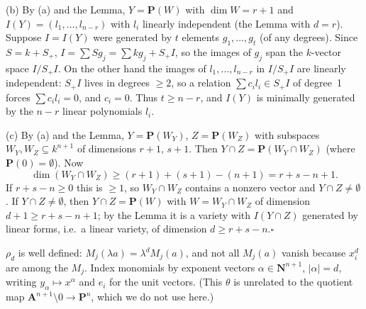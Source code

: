 \documentclass[11pt]{article}
\begin{document}
(b) By (a) and the Lemma, $Y=\mathbf P(W)$ with $\dim W=r+1$ and $I(Y)=(l_1,\dots,l_{n-r})$ with $l_i$ linearly independent (the Lemma with $d=r$). Suppose $I=I(Y)$ were generated by $t$ elements $g_1,\dots,g_t$ (of any degrees). Since $S=k+S_+$, $I=\sum Sg_j=\sum kg_j+S_+I$, so the images of $g_j$ span the $k$-vector space $I/S_+I$. On the other hand the images of $l_1,\dots,l_{n-r}$ in $I/S_+I$ are linearly independent: $S_+I$ lives in degrees $\ge2$, so a relation $\sum c_il_i\in S_+I$ of degree~1 forces $\sum c_il_i=0$, and $c_i=0$. Thus $t\ge n-r$, and $I(Y)$ is minimally generated by the $n-r$ linear polynomials $l_i$.

(c) By (a) and the Lemma, $Y=\mathbf P(W_Y)$, $Z=\mathbf P(W_Z)$ with subspaces $W_Y,W_Z\subseteq k^{n+1}$ of dimensions $r+1$, $s+1$. Then $Y\cap Z=\mathbf P(W_Y\cap W_Z)$ (where $\mathbf P(0)=\emptyset$). Now
\[
\dim(W_Y\cap W_Z)\ge(r+1)+(s+1)-(n+1)=r+s-n+1 .
\]
If $r+s-n\ge0$ this is $\ge1$, so $W_Y\cap W_Z$ contains a nonzero vector and $Y\cap Z\ne\emptyset$. If $Y\cap Z\ne\emptyset$, then $Y\cap Z=\mathbf P(W)$ with $W=W_Y\cap W_Z$ of dimension $d+1\ge r+s-n+1$; by the Lemma it is a variety with $I(Y\cap Z)$ generated by linear forms, i.e.\ a linear variety, of dimension $d\ge r+s-n$.\hfill$\square$

\pf
$\rho_d$ is well defined: $M_j(\lambda a)=\lambda^dM_j(a)$, and not all $M_j(a)$ vanish because $x_i^d$ are among the $M_j$. Index monomials by exponent vectors $\alpha\in\mathbf N^{n+1}$, $|\alpha|=d$, writing $y_\alpha\mapsto x^\alpha$ and $e_i$ for the unit vectors. (This $\theta$ is unrelated to the quotient map $\mathbf A^{n+1}\setminus0\to\mathbf P^n$, which we do not use here.)
\end{document}
